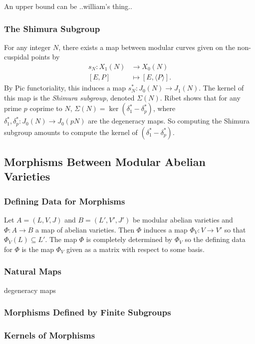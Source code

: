 \documentclass{article}
\begin{document}
An upper bound can be
..william's thing..

\subsubsection{The Shimura Subgroup}

For any integer $N$, there exists a map between modular curves given
on the non-cuspidal points by
\begin{align*}
    s_N: X_1(N) & \to X_0(N) \\
    [E, P]      & \mapsto [E, \langle P \rangle].
\end{align*}
By Pic functoriality, this induces a map $s_N ^*: J_0(N)\to J_1(N)$. The
kernel of this map is the \emph{Shimura subgroup}, denoted $\Sigma(N)$. Ribet
shows that for any prime $p$ coprime to $N$, $\Sigma(N)=\ker(\delta_1
^*-\delta_p ^*)$, where $\delta_1^*, \delta_p ^*:J_0(N)\to J_0(pN)$ are the
degeneracy maps. So computing the Shimura subgroup amounts to compute the
kernel of $(\delta_1 ^* - \delta_p ^*)$.

\subsection{Morphisms Between Modular Abelian Varieties}



\subsubsection{Defining Data for Morphisms}

Let $A=(L, V, J)$ and $B=(L', V', J')$ be modular abelian varieties and
$\Phi:A\to B$ a map of abelian varieties. Then $\Phi$ induces a map
$\Phi_V:V\to V'$ so that $\Phi_V(L)\subseteq L'$. The map $\Phi$ is completely
determined by $\Phi_V$ so the defining data for $\Phi$ is the map $\Phi_V$
given as a matrix with respect to some basis.

\subsubsection{Natural Maps}

degeneracy maps

\subsubsection{Morphisms Defined by Finite Subgroups}

\subsubsection{Kernels of Morphisms}\label{sec:kernelmodabvar}
\end{document}
